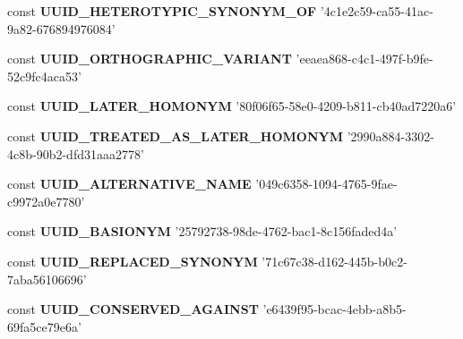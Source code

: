 \begin{DoxyCompactItemize}
\item 
\hypertarget{uuids_8php_af4b28b73c701ac9f12283708e08fca06}{const {\bfseries U\-U\-I\-D\-\_\-\-H\-E\-T\-E\-R\-O\-T\-Y\-P\-I\-C\-\_\-\-S\-Y\-N\-O\-N\-Y\-M\-\_\-\-O\-F} '4c1e2c59-\/ca55-\/41ac-\/9a82-\/676894976084'}\label{uuids_8php_af4b28b73c701ac9f12283708e08fca06}

\item 
\hypertarget{uuids_8php_a770c7b6081d82b8b59a6a2461ceb809b}{const {\bfseries U\-U\-I\-D\-\_\-\-O\-R\-T\-H\-O\-G\-R\-A\-P\-H\-I\-C\-\_\-\-V\-A\-R\-I\-A\-N\-T} 'eeaea868-\/c4c1-\/497f-\/b9fe-\/52c9fc4aca53'}\label{uuids_8php_a770c7b6081d82b8b59a6a2461ceb809b}

\item 
\hypertarget{uuids_8php_a6b470d92e25fce8af3326a4d26e09e34}{const {\bfseries U\-U\-I\-D\-\_\-\-L\-A\-T\-E\-R\-\_\-\-H\-O\-M\-O\-N\-Y\-M} '80f06f65-\/58e0-\/4209-\/b811-\/cb40ad7220a6'}\label{uuids_8php_a6b470d92e25fce8af3326a4d26e09e34}

\item 
\hypertarget{uuids_8php_aaf6b89a4fd925897b75a806da9ce51d7}{const {\bfseries U\-U\-I\-D\-\_\-\-T\-R\-E\-A\-T\-E\-D\-\_\-\-A\-S\-\_\-\-L\-A\-T\-E\-R\-\_\-\-H\-O\-M\-O\-N\-Y\-M} '2990a884-\/3302-\/4c8b-\/90b2-\/dfd31aaa2778'}\label{uuids_8php_aaf6b89a4fd925897b75a806da9ce51d7}

\item 
\hypertarget{uuids_8php_ab3fde0612e6f3bc1842d5074c7e8cdd5}{const {\bfseries U\-U\-I\-D\-\_\-\-A\-L\-T\-E\-R\-N\-A\-T\-I\-V\-E\-\_\-\-N\-A\-M\-E} '049c6358-\/1094-\/4765-\/9fae-\/c9972a0e7780'}\label{uuids_8php_ab3fde0612e6f3bc1842d5074c7e8cdd5}

\item 
\hypertarget{uuids_8php_a03d0c4d921e4b2804b3ea17249fca44b}{const {\bfseries U\-U\-I\-D\-\_\-\-B\-A\-S\-I\-O\-N\-Y\-M} '25792738-\/98de-\/4762-\/bac1-\/8c156faded4a'}\label{uuids_8php_a03d0c4d921e4b2804b3ea17249fca44b}

\item 
\hypertarget{uuids_8php_a0162875b3836dcf3d3084b1e2ac75310}{const {\bfseries U\-U\-I\-D\-\_\-\-R\-E\-P\-L\-A\-C\-E\-D\-\_\-\-S\-Y\-N\-O\-N\-Y\-M} '71c67c38-\/d162-\/445b-\/b0c2-\/7aba56106696'}\label{uuids_8php_a0162875b3836dcf3d3084b1e2ac75310}

\item 
\hypertarget{uuids_8php_a6f8e351fb293fd1193a13bbd95ae8402}{const {\bfseries U\-U\-I\-D\-\_\-\-C\-O\-N\-S\-E\-R\-V\-E\-D\-\_\-\-A\-G\-A\-I\-N\-S\-T} 'e6439f95-\/bcac-\/4ebb-\/a8b5-\/69fa5ce79e6a'}\label{uuids_8php_a6f8e351fb293fd1193a13bbd95ae8402}


\end{DoxyCompactItemize}
